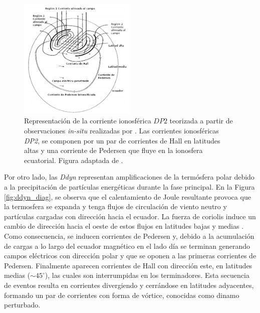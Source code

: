 \begin{figure}
	\centering
	\includegraphics[width=0.5\textwidth]{Images/dp2_edited.png}
	\caption{Representación de la corriente ionosférica $DP2$ teorizada a partir de observaciones \textit{in-situ} realizadas por \cite{nishida_68_fluctuations, nishida_andobayashi_67,nishida_68_coherence}. Las corrientes ionosféricas \emph{DP2}, se componen por un par de corrientes de Hall en latitudes altas y una corriente de Pedersen que fluye en la ionosfera ecuatorial. Figura adaptada de \cite{dp2_diag}.}
	\label{fig:dp2_diag}
\end{figure}


Por otro lado, las \emph{Ddyn} representan amplificaciones de la termósfera polar debido a la precipitación de partículas energéticas durante la fase principal. En la Figura \ref{fig:ddyn_diag}, se observa que el calentamiento de Joule resultante provoca que la termosfera se expanda y tenga  flujos de circulación de viento neutro y partículas cargadas con dirección hacia el ecuador. La fuerza de coriolis induce un cambio de dirección hacia el oeste de estos flujos en latitudes bajas y medias \parencite{blanc_ddyn, ddyn2005, angeoddyn}. Como consecuencia, se inducen corrientes de Pedersen y, debido a la acumulación de cargas a lo largo del ecuador magnético en el lado día se terminan generando  campos eléctricos con dirección polar y que se oponen a las primeras corrientes de Pedersen. Finalmente aparecen corrientes de Hall con dirección este, en latitudes medias ($\sim 45^\circ$), las cuales son interrumpidas en los  terminadores\cite{blanc_ddyn}. Esta secuencia de eventos resulta en corrientes divergiendo y cerrándose en latitudes adyacentes, formando un par de corrientes con forma de vórtice, conocidas como dinamo perturbado.
\vspace{1 em}

